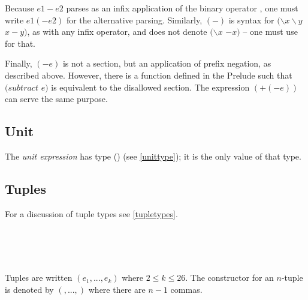 Because
$e1-e2$ parses as an infix application of the binary operator \term{$-$}, one must write $e1 (-e2)$ for the alternative
parsing. Similarly, $(-)$ is syntax for $(\backslash x \backslash y$ \arrow{} $x-y)$, 
as with any infix operator, and does not denote
$(\backslash x$ \arrow{} $-x)$ -- one must use  for that.

Finally, $(- e)$ is not a section, but an application of prefix negation,
as described above. However, there is a  function defined in the Prelude such
that $(subtract$  $e)$ is equivalent to the disallowed section. The expression $(+ (- e))$ can serve the
same purpose.


\subsection{Unit}

The \emph{unit expression} \sym{()} has type () (see \autoref{unittype}); it is the only value of that type.

\subsection{Tuples} \label{tupleterm} 

For a discussion of tuple types see \autoref{tupletypes}.

\begin{flushleft}
  \oder{}  \oder{} \\
 \sym{(,}\some{\sym{,}}\sym{)}\\
 \sym{(}\sym{,} \sym{)}\\
 \sym{(}\sym{;} \sym{)}
\end{flushleft}

Tuples are written $(e_1, ..., e_k)$ where $2\le k \le 26$.
The constructor for an $n$-tuple is denoted by $(,...,)$ where there are $n-1$ commas.

